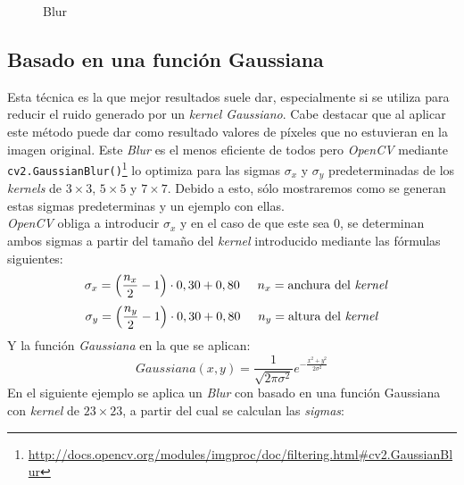 \begin{figure}[H]
  \centering \setlength\fboxsep{0pt} \setlength\fboxrule{0.5pt}
  \caption{Blur}
\end{figure}

\subsection{Basado en una función Gaussiana}
Esta técnica es la que mejor resultados suele dar, especialmente si se
utiliza para reducir el ruido generado por un \emph{kernel
  Gaussiano}. Cabe destacar que al aplicar este método puede dar como
resultado valores de píxeles que no estuvieran en la imagen
original. Este \emph{Blur} es el menos eficiente de todos pero
\emph{OpenCV} mediante
\texttt{cv2.GaussianBlur()}\footnote{\url{http://docs.opencv.org/modules/imgproc/doc/filtering.html\#cv2.GaussianBlur}}
lo optimiza para las sigmas $\sigma_x$ y $\sigma_y$ predeterminadas de
los \emph{kernels} de $3\times3$, $5\times5$ y $7\times7$. Debido a
esto, sólo mostraremos como se
generan estas sigmas predeterminas y un ejemplo con ellas.\\
\emph{OpenCV} obliga a introducir $\sigma_x$ y en el caso de que este sea
$0$, se determinan ambos sigmas a partir del tamaño del \emph{kernel}
introducido mediante las fórmulas siguientes:
\begin{equation*}
  \hspace{0.25cm}\sigma_x = \left(\frac{n_x}{2} - 1 \right) \cdot 0,30 + 0,80 \hspace{0.5cm} n_x = \text{anchura del \emph{kernel}}
\end{equation*}
\begin{equation*}
  \sigma_y = \left(\frac{n_y}{2} - 1 \right) \cdot 0,30 + 0,80 \hspace{0.5cm} n_y = \text{altura del \emph{kernel}}
\end{equation*}
Y la función \emph{Gaussiana} en la que se aplican:
\begin{equation*}
  Gaussiana(x, y) = \frac{1}{\sqrt{2 \pi \sigma^{2}}}e^{- \frac{x^{2}+y^{2}}{2\sigma^{2}}}
\end{equation*}
En el siguiente ejemplo se aplica un \emph{Blur} con basado en una función
Gaussiana con \emph{kernel} de $23 \times 23$, a partir del cual se
calculan las \emph{sigmas}:

